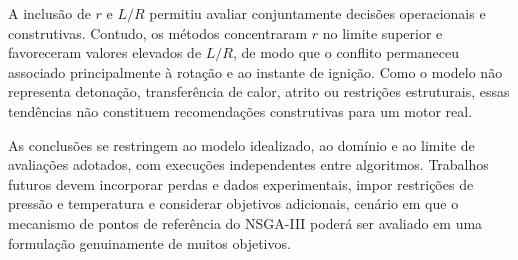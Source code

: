 \documentclass[a4paper,11pt]{article}
\begin{document}
A inclusão de $r$ e $L/R$ permitiu avaliar conjuntamente decisões operacionais
e construtivas. Contudo, os métodos concentraram $r$ no limite superior e
favoreceram valores elevados de $L/R$, de modo que o conflito permaneceu
associado principalmente à rotação e ao instante de ignição. Como o modelo não
representa detonação, transferência de calor, atrito ou restrições estruturais,
essas tendências não constituem recomendações construtivas para um motor real.

As conclusões se restringem ao modelo idealizado, ao domínio e ao limite de
avaliações adotados, com execuções independentes entre algoritmos. Trabalhos
futuros devem incorporar perdas e dados experimentais, impor restrições de
pressão e temperatura e considerar objetivos adicionais, cenário em que o
mecanismo de pontos de referência do NSGA-III poderá ser avaliado em uma
formulação genuinamente de muitos objetivos.




\end{document}
